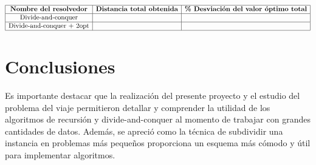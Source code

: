 \documentclass[titlepage]{article}
\begin{document}
	$$\begin{array}{|c|c|c|}
		\hline
		\textbf{Nombre del resolvedor} & \textbf{Distancia total obtenida} & \textbf{\% Desviaci\'on del valor \'optimo total}\\
		\hline
		\text{Divide-and-conquer} & & \\
		\hline
		\text{Divide-and-conquer + 2opt} & & \\
		\hline
	\end{array}$$\:
	\section{Conclusiones}
	
	Es importante destacar que la realizaci\'on del presente proyecto y el estudio del problema del viaje permitieron detallar y comprender la utilidad de los algoritmos de recursi\'on y divide-and-conquer al momento de trabajar con grandes cantidades de datos. Adem\'as, se apreci\'o como la t\'ecnica de subdividir una instancia en problemas m\'as pequeños proporciona un esquema m\'as c\'omodo y \'util para implementar algoritmos. 
\end{document}

